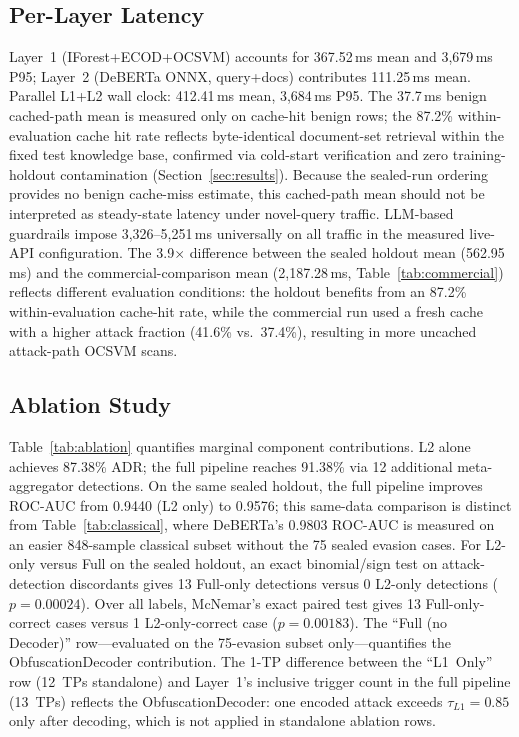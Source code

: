 ﻿\documentclass[conference]{IEEEtran}
\begin{document}
\subsection{Per-Layer Latency}

Layer~1 (IForest+ECOD+OCSVM) accounts for 367.52\,ms mean and 3{,}679\,ms
P95; Layer~2 (DeBERTa ONNX, query+docs) contributes 111.25\,ms mean.
Parallel L1+L2 wall clock: 412.41\,ms mean, 3{,}684\,ms P95.
The 37.7\,ms benign cached-path mean is measured only on cache-hit benign
rows; the 87.2\% within-evaluation cache hit rate reflects byte-identical
document-set retrieval within the fixed test knowledge base, confirmed via
cold-start verification and zero training-holdout contamination
(Section~\ref{sec:results}). Because the sealed-run ordering provides no
benign cache-miss estimate, this cached-path mean should not be interpreted
as steady-state latency under novel-query traffic. LLM-based guardrails impose
3{,}326--5{,}251\,ms universally on all
traffic in the measured live-API configuration.
The 3.9$\times$ difference between the sealed holdout mean (562.95\,ms) and
the commercial-comparison mean (2,187.28\,ms, Table~\ref{tab:commercial})
reflects different evaluation conditions: the holdout benefits from an 87.2\%
within-evaluation cache-hit rate, while the commercial run used a fresh cache
with a higher attack fraction (41.6\% vs.\ 37.4\%), resulting in more
uncached attack-path OCSVM scans.

\subsection{Ablation Study}

Table~\ref{tab:ablation} quantifies marginal component contributions.
L2 alone achieves 87.38\% ADR; the full pipeline reaches 91.38\% via 12
additional meta-aggregator detections.
On the same sealed holdout, the full pipeline improves ROC-AUC from 0.9440
(L2 only) to 0.9576; this same-data comparison is distinct from
Table~\ref{tab:classical}, where DeBERTa's 0.9803 ROC-AUC is measured on an
easier 848-sample classical subset without the 75 sealed evasion cases.
For L2-only versus Full on the sealed holdout, an exact binomial/sign test
on attack-detection discordants gives 13 Full-only detections versus 0
L2-only detections ($p=0.00024$). Over all labels, McNemar's exact paired
test gives 13 Full-only-correct cases versus 1 L2-only-correct case
($p=0.00183$).
The ``Full (no Decoder)'' row---evaluated on the 75-evasion subset
only---quantifies the ObfuscationDecoder contribution.
The 1-TP difference between the ``L1~Only'' row (12~TPs standalone) and
Layer~1's inclusive trigger count in the full pipeline (13~TPs) reflects the
ObfuscationDecoder: one encoded attack exceeds $\tau_{L1}=0.85$ only after
decoding, which is not applied in standalone ablation rows.
\end{document}
